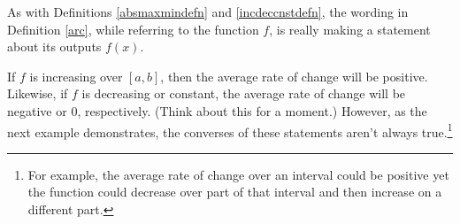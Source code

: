 \documentclass{ximera}
\begin{document}

\begin{center}
\end{center}

As with Definitions \ref{absmaxmindefn}  and \ref{incdeccnstdefn}, the wording in Definition \ref{arc}, while referring to the function $f$, is really making a statement about its outputs $f(x)$.  



If $f$ is increasing over $[a,b]$, then the average rate of change will be positive. Likewise, if $f$ is decreasing or constant, the average rate of change will be negative or $0$, respectively. (Think about this for a moment.) However, as the next example demonstrates, the converses of these statements aren't always true.\footnote{For example, the average rate of change over an interval could be positive yet the function could decrease over part of that interval and then increase on a different part.}
\end{document}
